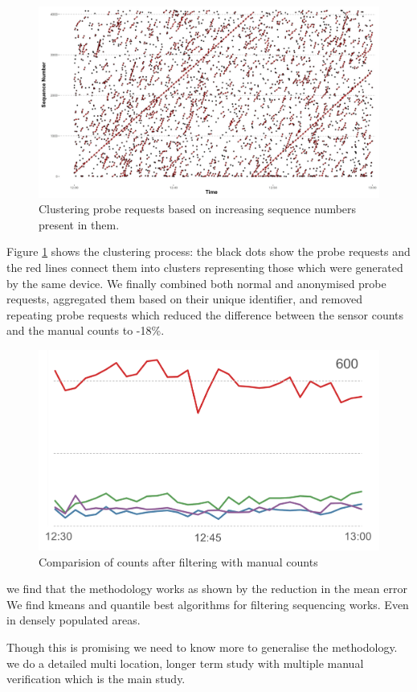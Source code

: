 \begin{figure}
	\begin{center}
		\includegraphics [width=0.85\linewidth,trim=4 4 4 4,clip] {images/methodology_clustering.png}
		\caption{Clustering probe requests based on increasing sequence numbers present in them.}
		\label{clustering_pilot}
	\end{center}
\end{figure}

Figure \ref{clustering_pilot} shows the clustering process: 
the black dots show the probe requests and the red lines 
connect them into clusters representing those which were
generated by the same device.
We finally combined both normal and anonymised probe requests,
aggregated them based on their unique identifier, and
removed repeating probe requests which reduced the difference
between the sensor counts and the manual counts to -18\%.

\begin{figure}
	\begin{center}
		\includegraphics [width=0.85\linewidth] {images/pilot_counts_comparision.png}
		\caption{Comparision of counts after filtering with manual counts}
		\label{comparision_pilot}
	\end{center}
\end{figure}

we find that the methodology works as shown by the reduction in the
mean error
We find kmeans and quantile best algorithms for filtering
sequencing works. Even in densely populated areas.

Though this is promising we need to know more to generalise the methodology.
we do a detailed multi location, longer term study with multiple manual
verification which is the main study.
